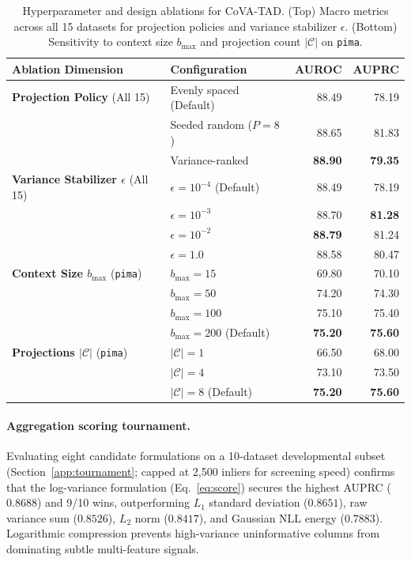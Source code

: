 \documentclass{article}
\begin{document}
\begin{table}[t]
\centering
\caption{Hyperparameter and design ablations for CoVA-TAD. (Top) Macro metrics across all 15 datasets for projection policies and variance stabilizer $\epsilon$. (Bottom) Sensitivity to context size $b_{\max}$ and projection count $|\mathcal{C}|$ on \texttt{pima}.}
\label{tab:ablations}
\small
\setlength{\tabcolsep}{6pt}
\begin{tabular}{llrr}
\toprule
Ablation Dimension & Configuration & AUROC & AUPRC \\
\midrule
\textbf{Projection Policy} (All 15) & Evenly spaced (Default) & 88.49 & 78.19 \\
 & Seeded random ($P=8$) & 88.65 & 81.83 \\
 & Variance-ranked & \textbf{88.90} & \textbf{79.35} \\
\midrule
\textbf{Variance Stabilizer $\epsilon$} (All 15) & $\epsilon = 10^{-4}$ (Default) & 88.49 & 78.19 \\
 & $\epsilon = 10^{-3}$ & 88.70 & \textbf{81.28} \\
 & $\epsilon = 10^{-2}$ & \textbf{88.79} & 81.24 \\
 & $\epsilon = 1.0$ & 88.58 & 80.47 \\
\midrule
\textbf{Context Size $b_{\max}$} (\texttt{pima}) & $b_{\max} = 15$ & 69.80 & 70.10 \\
 & $b_{\max} = 50$ & 74.20 & 74.30 \\
 & $b_{\max} = 100$ & 75.10 & 75.40 \\
 & $b_{\max} = 200$ (Default) & \textbf{75.20} & \textbf{75.60} \\
\midrule
\textbf{Projections $|\mathcal{C}|$} (\texttt{pima}) & $|\mathcal{C}| = 1$ & 66.50 & 68.00 \\
 & $|\mathcal{C}| = 4$ & 73.10 & 73.50 \\
 & $|\mathcal{C}| = 8$ (Default) & \textbf{75.20} & \textbf{75.60} \\
\bottomrule
\end{tabular}
\end{table}

\paragraph{Aggregation scoring tournament.}
Evaluating eight candidate formulations on a 10-dataset developmental subset (Section~\ref{app:tournament}; capped at 2,500 inliers for screening speed) confirms that the log-variance formulation (Eq.~\ref{eq:score}) secures the highest AUPRC ($0.8688$) and 9/10 wins, outperforming $L_1$ standard deviation ($0.8651$), raw variance sum ($0.8526$), $L_2$ norm ($0.8417$), and Gaussian NLL energy ($0.7883$). Logarithmic compression prevents high-variance uninformative columns from dominating subtle multi-feature signals.
\end{document}

